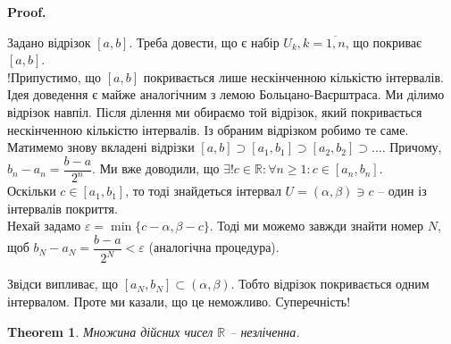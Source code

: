 \documentclass[a4paper, 14pt]{article}
\makeatletter
\def\qed{$\blacksquare$}
\theoremstyle{theoremdd}
\newtheorem{theorem}{Theorem}[subsection]
\theoremstyle{theoremdd}
\theoremstyle{theoremdd}
\theoremstyle{theoremdd}
\theoremstyle{theoremdd}
\theoremstyle{theoremdd}
\theoremstyle{theoremdd}
\theoremstyle{theoremdd}
\renewenvironment{proof}[1][Proof.\\]{\par
\pushQED{\hfill \qed}%
\normalfont \topsep6\p@\@plus6\p@\relax
\trivlist
\item\relax
{\bfseries
#1\@addpunct{.}}\hspace\labelsep\ignorespaces
}{%
\popQED\endtrivlist\@endpefalse
}
\makeatother
\begin{document}
	\begin{proof}
	Задано відрізок $[a,b]$. Треба довести, що є набір $U_k, k = \overline{1,n}$, що покриває $[a,b]$.\\
	!Припустимо, що $[a,b]$ покривається лише нескінченною кількістю інтервалів. \\ 
	Ідея доведення є майже аналогічним з лемою Больцано-Ваєрштраса. Ми ділимо відрізок навпіл. Після ділення ми обираємо той відрізок, який покривається нескінченною кількістю інтервалів. Із обраним відрізком робимо те саме.\\
	Матимемо знову вкладені відрізки $[a,b] \supset [a_1,b_1] \supset [a_2,b_2] \supset \dots$. Причому, $b_n - a_n = \dfrac{b-a}{2^n}$. Ми вже доводили, що $\exists! c \in \mathbb{R}: \forall n \geq 1: c \in [a_n,b_n]$.\\
	Оскільки $c \in [a_1,b_1]$, то тоді знайдеться інтервал $U = (\alpha,\beta) \ni c$ -- один із інтервалів покриття.\\
	Нехай задамо $\varepsilon = \min \{ c-\alpha, \beta-c \}$. Тоді ми можемо завжди знайти номер $N$, щоб $b_N - a_N = \dfrac{b-a}{2^N} < \varepsilon$ (аналогічна процедура).
	\begin{figure}[H]
	\centering
	\end{figure}
	Звідси випливає, що $[a_N,b_N] \subset (\alpha, \beta)$. Тобто відрізок покривається одним інтервалом. Проте ми казали, що це неможливо. Суперечність!
	\end{proof}
		
	\begin{theorem}
	Множина дійсних чисел $\mathbb{R}$ -- незліченна.
	\end{theorem}
	
\end{document}
